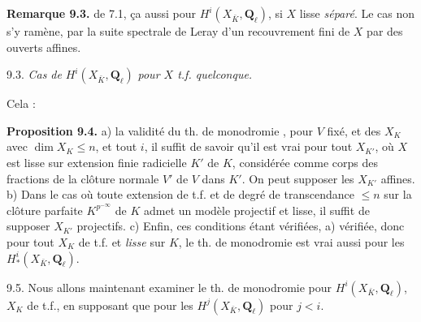 \documentclass[11pt,a4paper]{article}
\begin{document}
\textbf{Remarque 9.3.}  \ill{} \ill{} \ill{} de 7.1, ça \ill{} aussi pour $H^i(X_{\bar K}, \mathbf{Q}_\ell)$, si $X$ lisse \emph{séparé}. Le cas non  s'y ramène, par la suite spectrale de Leray d'un recouvrement fini de $X$ par des ouverts affines.


9.3. \emph{Cas de} $H^i(X_{\bar K}, \mathbf{Q}_\ell)$ \emph{pour $X$  t.f. quelconque.}

Cela  :

\textbf{Proposition 9.4.}  a)  la validité du th. de monodromie , pour $V$ fixé, et des $X_K$ avec $\dim X_K \leq n$, et tout $i$, il suffit de savoir qu'il est vrai pour tout $X_{K'}$, où $X$ est lisse  sur   extension finie radicielle $K'$ de $K$, considérée comme corps des fractions de la clôture normale $V'$ de $V$ dans $K'$. \struck{\ill{}} On peut \struck{\ill{} \ill{}} \ill{} \ill{} supposer les $X_{K'}$ affines.  b) Dans le cas où  toute extension de t.f. et de degré de transcendance $\leq n$ sur la clôture parfaite $K^{p^{-\infty}}$ de $K$ admet un modèle projectif et lisse, il suffit de supposer  $X_{K'}$ projectifs. c) Enfin,  ces conditions  \ill{} étant vérifiées, \ill{} a) \ill{} vérifiée, donc pour tout $X_K$ de t.f. et \emph{lisse} sur $K$,  le th. de monodromie est vrai aussi pour les $H^i_*(X_{\bar K}, \mathbf{Q}_\ell)$.

9.5. Nous allons maintenant examiner le th. de monodromie pour $H^i(X_{\bar K}, \mathbf{Q}_\ell)$,  $X_K$ de t.f., en supposant que   \ill{}  pour les $H^j(X_{\bar K}, \mathbf{Q}_\ell)$ pour $j < i$.
\end{document}
